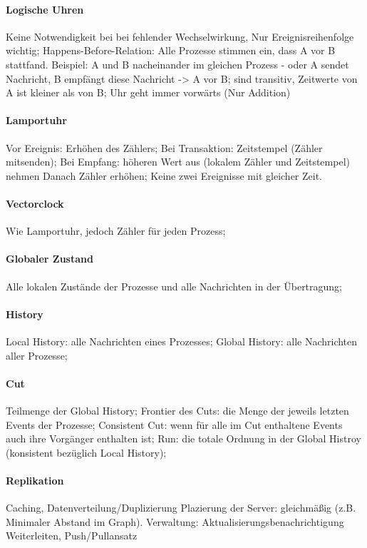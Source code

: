 \documentclass[pagesize,11pt,a4paper]{scrartcl}
\begin{document}
\paragraph*{Logische Uhren}
	Keine Notwendigkeit bei bei fehlender Wechselwirkung, Nur Ereignisreihenfolge wichtig;
	Happens-Before-Relation: Alle Prozesse stimmen ein, dass A vor B stattfand.
		Beispiel: A und B nacheinander im gleichen Prozess -
		oder A sendet Nachricht, B empfängt diese Nachricht -> A vor B;
	sind transitiv, Zeitwerte von A ist kleiner als von B;
	Uhr geht immer vorwärts (Nur Addition)

\paragraph*{Lamportuhr}
	Vor Ereignis: Erhöhen des Zählers;
	Bei Transaktion: Zeitstempel (Zähler mitsenden);
	Bei Empfang: höheren Wert aus (lokalem Zähler und Zeitstempel) nehmen Danach Zähler erhöhen;
	Keine zwei Ereignisse mit gleicher Zeit.

\paragraph*{Vectorclock}
	Wie Lamportuhr, jedoch Zähler für jeden Prozess;

\paragraph{Globaler Zustand}
	Alle lokalen Zustände der Prozesse und alle Nachrichten in der Übertragung;
	
\paragraph*{History}
	Local History: alle Nachrichten eines Prozesses;
	Global History: alle Nachrichten aller Prozesse;
	
\paragraph*{Cut}
	Teilmenge der Global History;
	Frontier des Cuts: die Menge der jeweils letzten Events der Prozesse;
	Consistent Cut: wenn für alle im Cut enthaltene Events auch ihre Vorgänger enthalten ist;
	Run: die totale Ordnung in der Global Histroy (konsistent bezüglich Local History);

\paragraph{Replikation}
	Caching, Datenverteilung/Duplizierung
	Plazierung der Server: gleichmäßig (z.B. Minimaler Abstand im Graph).
	Verwaltung: Aktualisierungsbenachrichtigung Weiterleiten, Push/Pullansatz
\end{document}

